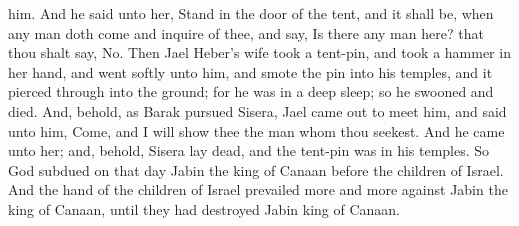 him. And he said unto her, Stand in the door of the tent, and it shall be, when any man doth come and inquire of thee, and say, Is there any man here? that thou shalt say, No. Then Jael Heber’s wife took a tent-pin, and took a hammer in her hand, and went softly unto him, and smote the pin into his temples, and it pierced through into the ground; for he was in a deep sleep; so he swooned and died. And, behold, as Barak pursued Sisera, Jael came out to meet him, and said unto him, Come, and I will show thee the man whom thou seekest. And he came unto her; and, behold, Sisera lay dead, and the tent-pin was in his temples.  So God subdued on that day Jabin the king of Canaan before the children of Israel. And the hand of the children of Israel prevailed more and more against Jabin the king of Canaan, until they had destroyed Jabin king of Canaan. 

